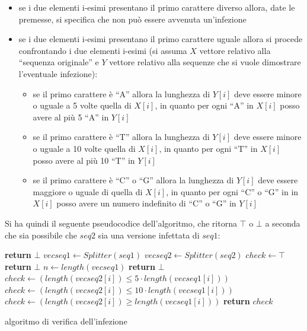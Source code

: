 \documentclass[a4paper,12pt, oneside]{book}
\begin{document}
\begin{itemize}
  \item se i due elementi i-esimi presentano il primo carattere diverso allora,
  date le premesse, si specifica che non può essere avvenuta un'infezione
  \item se i due elementi i-esimi presentano il primo carattere uguale allora si
  procede confrontando i due elementi i-esimi (si assuma $X$ vettore relativo
  alla ``sequenza originale'' e $Y$ vettore relativo alla sequenze che si vuole
  dimostrare l'eventuale infezione):
  \begin{itemize}
    \item se il primo carattere è ``A'' allora la lunghezza di $Y[i]$ deve
    essere minore o uguale a 5 volte quella di $X[i]$, in quanto per ogni ``A''
    in $X[i]$ posso avere al più 5 ``A'' in $Y[i]$
    \item se il primo carattere è ``T'' allora la lunghezza di $Y[i]$ deve
    essere minore o uguale a 10 volte quella di $X[i]$, in quanto per ogni ``T''
    in $X[i]$ posso avere al più 10 ``T'' in $Y[i]$
    \item se il primo carattere è ``C'' o ``G'' allora la lunghezza di $Y[i]$
    deve essere maggiore o uguale di quella di $X[i]$, in quanto per ogni ``C''
    o ``G'' in  in $X[i]$ posso avere un numero indefinito di ``C'' o ``G'' in
    $Y[i]$ 
  \end{itemize}
\end{itemize}
Si ha quindi il seguente pseudocodice dell'algoritmo, che ritorna $\top$ o
$\bot$ a seconda che sia possibile che $seq2$ sia una versione infettata di
$seq1$:
\begin{algorithm}[H]
  \begin{algorithmic}[1]
    \State \textbf{return} $\bot$
    \EndIf
    \State $vecseq1\gets Splitter(seq1)$
    \State $vecseq2\gets Splitter(seq2)$
    \State $check \gets \top$
    \State \textbf{return} $\bot$
    \EndIf
    \State $n \gets length(vecseq1)$
    \State \textbf{return} $\bot$
    \EndIf
    \State $check \gets (length(vecseq2[i]) \leq 5\cdot length(vecseq1[i]))$
    \State $check \gets (length(vecseq2[i]) \leq 10\cdot length(vecseq1[i]))$
    \Else
    \State $check \gets (length(vecseq2[i]) \geq length(vecseq1[i]))$
    \EndIf
    \EndFor
    \State \textbf{return} $check$
    \EndFunction
  \end{algorithmic}
  \caption{algoritmo di verifica dell'infezione}
\end{algorithm}
\end{document}
